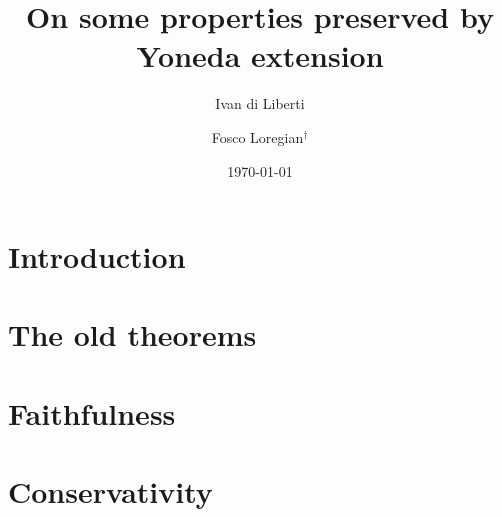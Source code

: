 \documentclass[a4paper,10pt]{amsart}
\title{On some properties preserved by Yoneda extension}
\author{Ivan di Liberti}
\author{Fosco Loregian$^\dag$}
\date{\today}
\begin{document}
\maketitle
\begin{abstract}

\end{abstract}
\section{Introduction}
	
\section{The old theorems}
	
\section{Faithfulness}
\section{Conservativity}
%
%
%
{}

\hrulefill 
\end{document}

